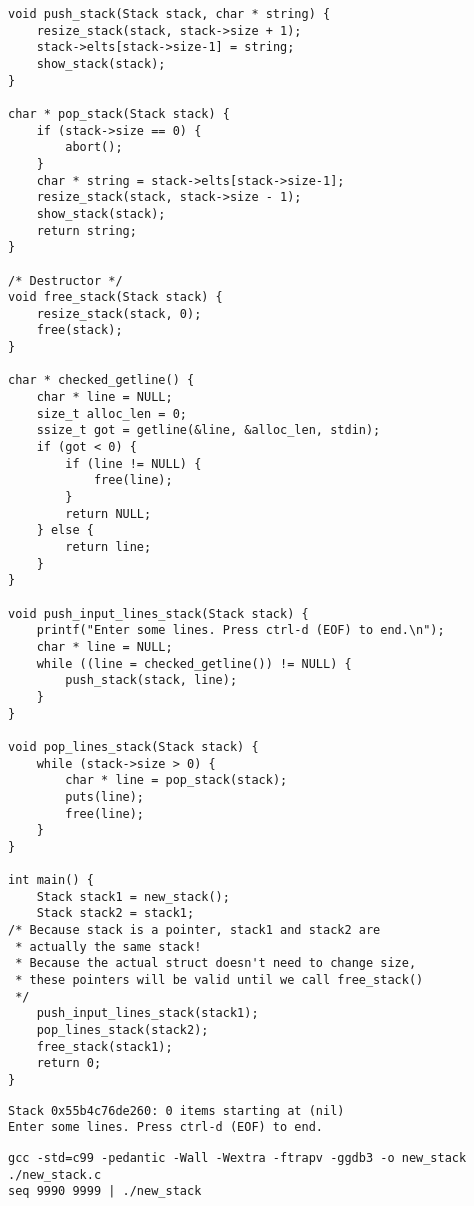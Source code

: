 \documentclass[11pt]{article}
\begin{document}
\begin{verbatim}
void push_stack(Stack stack, char * string) {
    resize_stack(stack, stack->size + 1);
    stack->elts[stack->size-1] = string;
    show_stack(stack);
}

char * pop_stack(Stack stack) {
    if (stack->size == 0) {
        abort();
    }
    char * string = stack->elts[stack->size-1];
    resize_stack(stack, stack->size - 1);
    show_stack(stack);
    return string;
}

/* Destructor */
void free_stack(Stack stack) {
    resize_stack(stack, 0);
    free(stack);
}

char * checked_getline() {
    char * line = NULL;
    size_t alloc_len = 0;
    ssize_t got = getline(&line, &alloc_len, stdin);
    if (got < 0) {
        if (line != NULL) {
            free(line);
        }
        return NULL;
    } else {
        return line;
    }
}

void push_input_lines_stack(Stack stack) {
    printf("Enter some lines. Press ctrl-d (EOF) to end.\n");
    char * line = NULL;
    while ((line = checked_getline()) != NULL) {
        push_stack(stack, line);
    }
}

void pop_lines_stack(Stack stack) {
    while (stack->size > 0) {
        char * line = pop_stack(stack);
        puts(line);
        free(line);
    }
}

int main() {
    Stack stack1 = new_stack();
    Stack stack2 = stack1;
/* Because stack is a pointer, stack1 and stack2 are 
 * actually the same stack!
 * Because the actual struct doesn't need to change size,
 * these pointers will be valid until we call free_stack()
 */
    push_input_lines_stack(stack1);
    pop_lines_stack(stack2);
    free_stack(stack1);
    return 0;
}
\end{verbatim}

\begin{verbatim}
Stack 0x55b4c76de260: 0 items starting at (nil)
Enter some lines. Press ctrl-d (EOF) to end.
\end{verbatim}

\begin{verbatim}
gcc -std=c99 -pedantic -Wall -Wextra -ftrapv -ggdb3 -o new_stack ./new_stack.c
seq 9990 9999 | ./new_stack
\end{verbatim}
\end{document}
